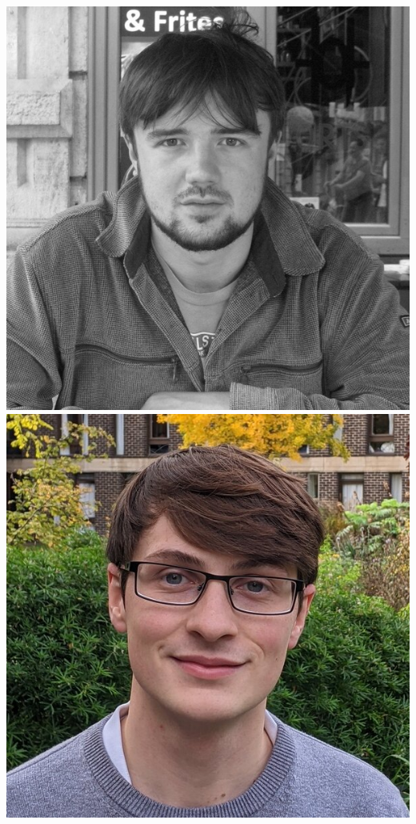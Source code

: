 \documentclass[aspectratio=169]{beamer}
\begin{document}
\begin{frame}
{        \includegraphics[width=0.09\textheight]{figures/students/sam_leeney.jpg}%
        \includegraphics[width=0.09\textheight]{figures/students/thomas_gessey-jones.jpg}%
}
\end{frame}
\end{document}
